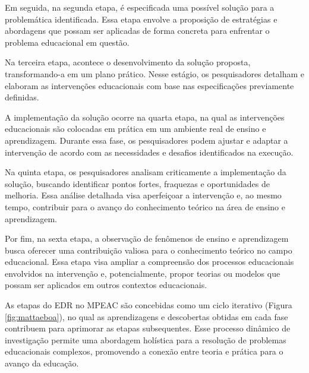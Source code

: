 Em seguida, na segunda etapa, é especificada uma possível solução para a problemática identificada. Essa etapa envolve a proposição de estratégias e abordagens que possam ser aplicadas de forma concreta para enfrentar o problema educacional em questão.

Na terceira etapa, acontece o desenvolvimento da solução proposta, transformando-a em um plano prático. Nesse estágio, os pesquisadores detalham e elaboram as intervenções educacionais com base nas especificações previamente definidas.

A implementação da solução ocorre na quarta etapa, na qual as intervenções educacionais são colocadas em prática em um ambiente real de ensino e aprendizagem. Durante essa fase, os pesquisadores podem ajustar e adaptar a intervenção de acordo com as necessidades e desafios identificados na execução.

Na quinta etapa, os pesquisadores analisam criticamente a implementação da solução, buscando identificar pontos fortes, fraquezas e oportunidades de melhoria. Essa análise detalhada visa aperfeiçoar a intervenção e, ao mesmo tempo, contribuir para o avanço do conhecimento teórico na área de ensino e aprendizagem.

Por fim, na sexta etapa, a observação de fenômenos de ensino e aprendizagem busca oferecer uma contribuição valiosa para o conhecimento teórico no campo educacional. Essa etapa visa ampliar a compreensão dos processos educacionais envolvidos na intervenção e, potencialmente, propor teorias ou modelos que possam ser aplicados em outros contextos educacionais.

As etapas do EDR no MPEAC são concebidas como um ciclo iterativo (Figura \ref{fig:mattaeboa}), no qual as aprendizagens e descobertas obtidas em cada fase contribuem para aprimorar as etapas subsequentes. Esse processo dinâmico de investigação permite uma abordagem holística para a resolução de problemas educacionais complexos, promovendo a conexão entre teoria e prática para o avanço da educação.
